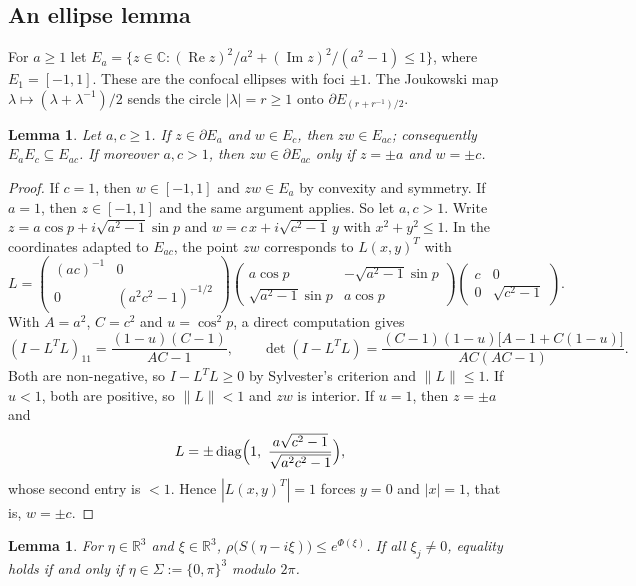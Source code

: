 \documentclass[11pt]{amsart}
\newtheorem{lemma}[theorem]{Lemma}
\theoremstyle{definition}
\theoremstyle{remark}
\newcommand{\R}{\mathbb{R}}
\newcommand{\C}{\mathbb{C}}
\newcommand{\re}{\operatorname{Re}}
\newcommand{\im}{\operatorname{Im}}
\begin{document}
\subsection{An ellipse lemma}
For $a\ge1$ let
$E_a=\{z\in\C:(\re z)^2/a^2+(\im z)^2/(a^2-1)\le1\}$, where $E_1=[-1,1]$.
These are the confocal ellipses with foci $\pm1$.  The Joukowski map
$\lambda\mapsto(\lambda+\lambda^{-1})/2$ sends the circle $|\lambda|=r\ge1$
onto $\partial E_{(r+r^{-1})/2}$.

\begin{lemma}\label{lem:ellipse}
Let $a,c\ge1$.  If $z\in\partial E_a$ and $w\in E_c$, then $zw\in E_{ac}$;
consequently $E_aE_c\subseteq E_{ac}$.  If moreover $a,c>1$, then
$zw\in\partial E_{ac}$ only if $z=\pm a$ and $w=\pm c$.
\end{lemma}

\begin{proof}
If $c=1$, then $w\in[-1,1]$ and $zw\in E_a$ by convexity and symmetry.  If
$a=1$, then $z\in[-1,1]$ and the same argument applies.  So let $a,c>1$.
Write
$z=a\cos p+i\sqrt{a^2-1}\sin p$ and $w=c\,x+i\sqrt{c^2-1}\,y$ with
$x^2+y^2\le1$.  In the coordinates adapted to $E_{ac}$, the point $zw$
corresponds to $L(x,y)^T$ with
\[
L=\begin{pmatrix}(ac)^{-1}&0\\0&(a^2c^2-1)^{-1/2}\end{pmatrix}
\begin{pmatrix}a\cos p&-\sqrt{a^2-1}\sin p\\ \sqrt{a^2-1}\sin p&a\cos p\end{pmatrix}
\begin{pmatrix}c&0\\0&\sqrt{c^2-1}\end{pmatrix}.
\]
With $A=a^2$, $C=c^2$ and $u=\cos^2p$, a direct computation gives
\[
(I-L^TL)_{11}=\frac{(1-u)(C-1)}{AC-1},\qquad
\det(I-L^TL)=\frac{(C-1)(1-u)\bigl[A-1+C(1-u)\bigr]}{AC(AC-1)} .
\]
Both are non-negative, so $I-L^TL\ge0$ by Sylvester's criterion and
$\|L\|\le1$.  If $u<1$, both are positive, so $\|L\|<1$ and $zw$ is
interior.  If $u=1$, then $z=\pm a$ and
\[
L=\pm\operatorname{diag}\Bigl(1,\ \frac{a\sqrt{c^2-1}}{\sqrt{a^2c^2-1}}\Bigr),
\]
whose second entry is $<1$.  Hence $|L(x,y)^T|=1$ forces $y=0$ and $|x|=1$,
that is, $w=\pm c$.
\end{proof}

\begin{lemma}\label{lem:specrad}
For $\eta\in\R^3$ and $\xi\in\R^3$,
$\rho\bigl(S(\eta-i\xi)\bigr)\le e^{\Phi(\xi)}$.  If all $\xi_j\ne0$, equality
holds if and only if $\eta\in\Sigma:=\{0,\pi\}^3$ modulo $2\pi$.
\end{lemma}
\end{document}
